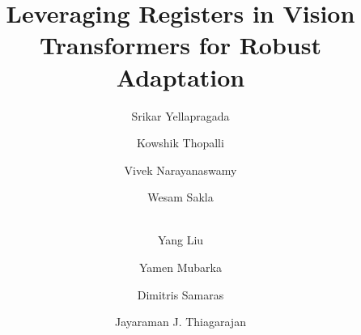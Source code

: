 \documentclass[conference]{IEEEtran}
\begin{document}
\renewcommand\Authands{,}

\newcommand{\affiliations}[2]{\vspace{-\bigskipamount}  \begin{center}
    \Affilfont
    \textsuperscript{1}#1,
    \textsuperscript{2}#2
  \end{center}
}


\title{Leveraging Registers in Vision Transformers for Robust Adaptation\\
}


\author[1]{Srikar Yellapragada}
\author[2]{Kowshik Thopalli}
\author[2]{Vivek Narayanaswamy}
\author[2]{Wesam Sakla} 
\author[2]{\\Yang Liu}
\author[2]{Yamen Mubarka}
\author[1]{Dimitris Samaras}
\author[2]{ Jayaraman J. Thiagarajan}



\maketitle
\end{document}
